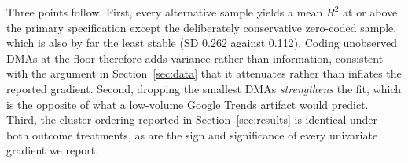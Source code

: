 \documentclass[11pt]{article}
\begin{document}
Three points follow. First, every alternative sample yields a mean $R^2$ at or above the primary specification except the deliberately conservative zero-coded sample, which is also by far the least stable (SD 0.262 against 0.112). Coding unobserved DMAs at the floor therefore adds variance rather than information, consistent with the argument in Section~\ref{sec:data} that it attenuates rather than inflates the reported gradient. Second, dropping the smallest DMAs \emph{strengthens} the fit, which is the opposite of what a low-volume Google Trends artifact would predict. Third, the cluster ordering reported in Section~\ref{sec:results} is identical under both outcome treatments, as are the sign and significance of every univariate gradient we report.
\end{document}
